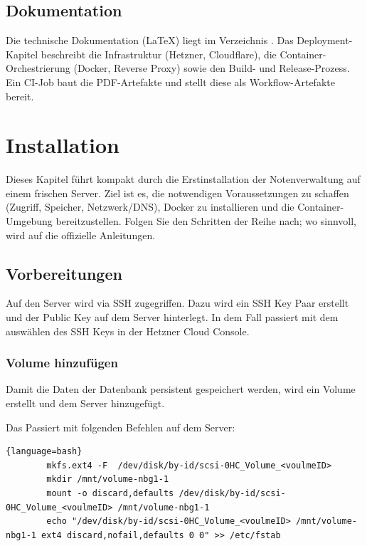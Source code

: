 \documentclass[11pt]{article}
\newcommand{\code}[1]{\texttt{\detokenize{#1}}}
\begin{document}
    \subsection{Dokumentation}
    Die technische Dokumentation (LaTeX) liegt im Verzeichnis \code{documentation}. Das Deployment-Kapitel beschreibt die
    Infrastruktur (Hetzner, Cloudflare), die Container-Orchestrierung (Docker, Reverse Proxy) sowie den Build- und Release-Prozess.
    Ein CI-Job baut die PDF-Artefakte und stellt diese als Workflow-Artefakte bereit.


    \section{Installation}
    Dieses Kapitel führt kompakt durch die Erstinstallation der Notenverwaltung auf einem frischen Server.\newline
    Ziel ist es, die notwendigen Voraussetzungen zu schaffen (Zugriff, Speicher, Netzwerk/DNS), Docker zu installieren
    und die Container-Umgebung bereitzustellen. Folgen Sie den Schritten der Reihe nach; wo sinnvoll, wird auf die
    offizielle Anleitungen.

    \subsection{Vorbereitungen}
    Auf den Server wird via SSH zugegriffen. Dazu wird ein SSH Key Paar erstellt und der Public Key auf dem Server hinterlegt.
    In dem Fall passiert mit dem auswählen des SSH Keys in der Hetzner Cloud Console.

    \subsubsection{Volume hinzufügen}
    Damit die Daten der Datenbank persistent gespeichert werden, wird ein Volume erstellt und dem Server hinzugefügt.

    Das Passiert mit folgenden Befehlen auf dem Server:
    \begin{lstlisting}[label={lst:Setup Volume}]{language=bash}
        mkfs.ext4 -F  /dev/disk/by-id/scsi-0HC_Volume_<voulmeID>
        mkdir /mnt/volume-nbg1-1
        mount -o discard,defaults /dev/disk/by-id/scsi-0HC_Volume_<voulmeID> /mnt/volume-nbg1-1
        echo "/dev/disk/by-id/scsi-0HC_Volume_<voulmeID> /mnt/volume-nbg1-1 ext4 discard,nofail,defaults 0 0" >> /etc/fstab
    \end{lstlisting}
\end{document}
